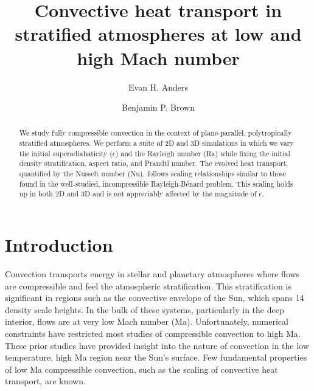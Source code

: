 \documentclass[aps, pre, onecolumn, nofootinbib, notitlepage, groupedaddress, amsfonts, amssymb, amsmath, longbibliography]{revtex4-1}
\begin{document}
\author{Evan H. Anders}
\author{Benjamin P. Brown}
\title{Convective heat transport in stratified atmospheres at low and high Mach number}

\begin{abstract}
We study fully compressible convection in the context of 
plane-parallel, polytropically stratified atmospheres. 
We perform a suite of 2D and 3D simulations in which we vary the initial
superadiabaticity ($\epsilon$) and the Rayleigh number (Ra) while fixing the
initial density stratification, aspect
ratio, and Prandtl number.
The evolved heat transport, 
quantified by the Nusselt number (Nu),
follows scaling relationships similar to those found in the well-studied, 
incompressible Rayleigh-B\'{e}nard problem.  This scaling holds up in both 2D and 3D and is not
appreciably affected by the magnitude of $\epsilon$.
\end{abstract}
\maketitle


\section{Introduction}
\label{sec:intro}
Convection transports energy in stellar and planetary atmospheres
where flows are compressible and
feel the atmospheric stratification.  This stratification 
is significant in regions such as
the convective envelope of the Sun, which spans 14 density scale heights.
In the bulk of these systems, particularly in the deep interior,
flows are at very low Mach number (Ma).  Unfortunately,
numerical constraints have restricted most studies of 
compressible convection to high Ma.
These prior studies \cite{graham1975, chan&all1982,
hurlburt&all1984, cattaneo&all1990, brummell&all1996,
brandenburg&all2005} have provided insight into the nature of
convection in the low temperature,
high Ma region near the Sun's surface. Few fundamental
properties of low Ma compressible convection, such as the scaling of
convective heat transport, are known.
\end{document}
